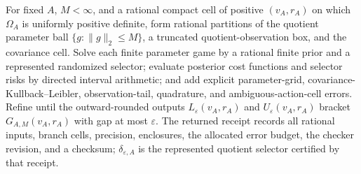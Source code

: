 For fixed \(A\), \(M<\infty\), and a rational compact cell of positive \((v_A,r_A)\) on which \(\Omega_A\) is uniformly positive definite, form rational partitions of the quotient parameter ball \(\{g:\lVert g\rVert_2\leq M\}\), a truncated quotient-observation box, and the covariance cell.  Solve each finite parameter game by a rational finite prior and a represented randomized selector; evaluate posterior cost functions and selector risks by directed interval arithmetic; and add explicit parameter-grid, covariance-Kullback--Leibler, observation-tail, quadrature, and ambiguous-action-cell errors.  Refine until the outward-rounded outputs \(L_\varepsilon(v_A,r_A)\) and \(U_\varepsilon(v_A,r_A)\) bracket \(G_{A,M}(v_A,r_A)\) with gap at most \(\varepsilon\).  The returned receipt records all rational inputs, branch cells, precision, enclosures, the allocated error budget, the checker revision, and a checksum; \(\delta_{\varepsilon,A}\) is the represented quotient selector certified by that receipt.
